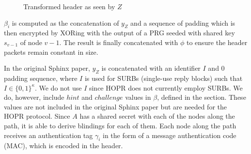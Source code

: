 \begin{figure}[H]
    \caption{Transformed header as seen by $Z$}
\end{figure}

$\beta_i$ is computed as the concatenation of $y_Z$ and a sequence of padding which is then encrypted by XORing with the output of a PRG seeded with shared key $s_{v-1}$ of node $v-1$. The result is finally concatenated with $\phi$ to ensure the header packets remain constant in size.

In the original Sphinx paper, $y_Z$ is concatenated with an identifier $I$ and $0$ padding sequence, where $I$ is used for SURBs (single-use reply blocks) such that $I \in \{0, 1\}^\kappa$. We do not use $I$ since HOPR does not currently employ SURBs. We do, however, include $hint$ and $challenge$ values in $\beta$, defined in the  section. These values are not included in the original Sphinx paper but are needed for the HOPR protocol. Since $A$ has a shared secret with each of the nodes along the path, it is able to derive blindings for each of them. Each node along the path receives an authentication tag $\gamma_i$ in the form of a message authentication code (MAC), which is encoded in the header.

